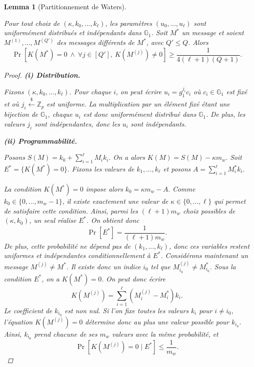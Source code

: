 \documentclass[10pt,a4paper]{article}
\theoremstyle{definition}
\theoremstyle{plain}
\newtheorem{lemma}[definition]{Lemma}
\theoremstyle{remark}
\newcommand{\sample}{\xleftarrow{\$}}
\begin{document}
\begin{lemma}[Partitionnement de Waters]
\label{lem:partitioning}

Pour tout choix de $(\kappa,k_0,\ldots,k_\ell)$, les paramètres
$(u_0,\ldots,u_\ell)$ sont uniformément distribués et indépendants
dans $\mathbb{G}_1$.
Soit $M^*$ un message et soient
$M^{(1)},\ldots,M^{(Q')}$ des messages différents de $M^*$,
avec $Q'\leq Q$. Alors
\[
\Pr\left[
K(M^*)=0
\ \land\
\forall j\in[Q'],\ K(M^{(j)})\neq0
\right]
\geq
\frac{1}{4(\ell+1)(Q+1)}.
\]

\begin{proof}

\textbf{(i) Distribution.}

Fixons $(\kappa,k_0,\ldots,k_\ell)$. Pour chaque $i$, on peut écrire
$
u_i=g_1^{j_i}c_i
$
où $c_i\in\mathbb{G}_1$ est fixé et où
$j_i\sample\mathbb{Z}_p$ est uniforme.
La multiplication par un élément fixé étant une bijection de
$\mathbb{G}_1$, chaque $u_i$ est donc uniformément distribué dans
$\mathbb{G}_1$. De plus, les valeurs $j_i$ sont indépendantes, donc les
$u_i$ sont indépendants.

\medskip

\textbf{(ii) Programmabilité.}

Posons
$
S(M)=k_0+\sum_{i=1}^{\ell}M_i k_i.
$
On a alors
$
K(M)=S(M)-\kappa m_w.
$
Soit
$
E^*=\{K(M^*)=0\}.
$
Fixons les valeurs de $k_1,\ldots,k_\ell$ et posons
$
A=\sum_{i=1}^{\ell}M_i^*k_i.
$

La condition $K(M^*)=0$ impose alors
$
k_0=\kappa m_w-A.
$
Comme $k_0\in\{0,\ldots,m_w-1\}$, il existe exactement une valeur de
$\kappa\in\{0,\ldots,\ell\}$ qui permet de satisfaire cette condition.
Ainsi, parmi les $(\ell+1)m_w$ choix possibles de $(\kappa,k_0)$, un seul
réalise $E^*$. On obtient donc
\[
\Pr[E^*]
=
\frac{1}{(\ell+1)m_w}.
\]
De plus, cette probabilité ne dépend pas de
$(k_1,\ldots,k_\ell)$, donc ces variables restent uniformes et
indépendantes conditionnellement à $E^*$.
Considérons maintenant un message
$M^{(j)}\neq M^*$.
Il existe donc un indice $i_0$ tel que
$
M_{i_0}^{(j)}\neq M_{i_0}^*.
$
Sous la condition $E^*$, on a $K(M^*)=0$. On peut donc écrire
\[
K(M^{(j)})
=
\sum_{i=1}^{\ell}
\left(M_i^{(j)}-M_i^*\right)k_i.
\]
Le coefficient de $k_{i_0}$ est non nul. Si l'on fixe toutes les
valeurs $k_i$ pour $i\neq i_0$, l'équation
$
K(M^{(j)})=0
$
détermine donc au plus une valeur possible pour $k_{i_0}$.
Ainsi, $k_{i_0}$ prend chacune
de ses $m_w$ valeurs avec la même probabilité, et
\[
\Pr\left[
K(M^{(j)})=0\mid E^*
\right]
\leq
\frac{1}{m_w}.
\]


\end{proof}
\end{lemma}
\end{document}
